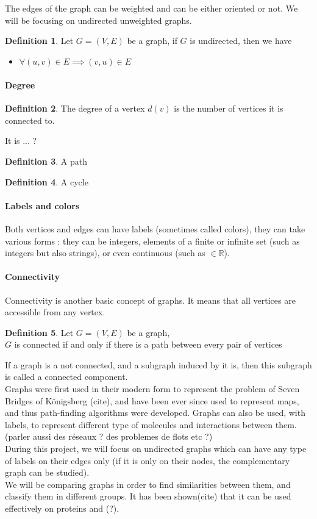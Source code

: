 \documentclass{article}
\newcommand*{\R}{%
  \mathbb{R}%
}
\theoremstyle{definition}
\newtheorem{definition}{Definition}
\begin{document}
The edges of the graph can be weighted and can be either oriented or not. We will be focusing on undirected unweighted graphs.
\begin{definition}
	Let $G=(V,E)$ be a graph, if $G$ is undirected, then we have
	\begin{itemize}
		\item $\forall (u,v) \in E \implies (v,u)\in E$
	\end{itemize}
\end{definition}
\paragraph{Degree}
\begin{definition}
	The degree of a vertex $d(v)$ is the number of vertices it is connected to.
\end{definition}
It is ... ?
\begin{definition}
	A path
\end{definition}
\begin{definition}
	A cycle
\end{definition}
\paragraph{Labels and colors}
Both vertices and edges can have labels (sometimes called colors), they can take various forms : they can be integers, elements of a finite or infinite set (such as integers but also strings), or even continuous (such as $\in \R$).
\paragraph{Connectivity}
Connectivity is another basic concept of graphs. It means that all vertices are accessible from any vertex.
\begin{definition}
	Let $G=(V,E)$ be a graph,\\
	$G$ is connected if and only if there is a path between every pair of vertices
\end{definition} 
If a graph is a not connected, and a subgraph induced by it is, then this subgraph is called a connected component.
\\
Graphs were first used in their modern form to represent the problem of Seven Bridges of Königsberg (cite), and have been ever since used to represent maps, and thus path-finding algorithms were developed. Graphs can also be used, with labels, to represent different type of molecules and interactions between them.(parler aussi des réseaux ? des problemes de flots etc ?)\\
During this project, we will focus on undirected graphs which can have any type of labels on their edges only (if it is only on their nodes, the complementary graph can be studied).\\
We will be comparing graphs in order to find similarities between them, and classify them in different groups. It has been shown(cite) that it can be used effectively on proteins and (?).
\end{document}
